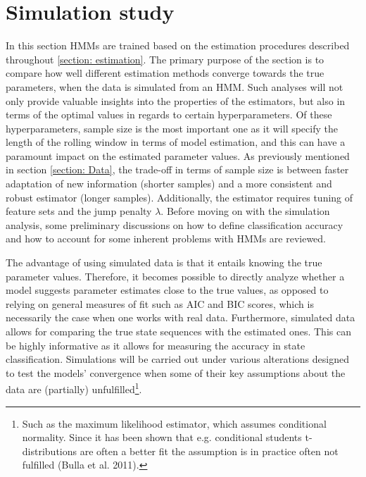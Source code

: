 \newpage

\section{Simulation study}
\label{Section: Simulation study}

In this section HMMs are trained based on the estimation procedures described throughout \cref{section: estimation}. The primary purpose of the section is to compare how well different estimation methods converge towards the true parameters, when the data is simulated from an HMM. Such analyses will not only provide valuable insights into the properties of the estimators, but also in terms of the optimal values in regards to certain hyperparameters. Of these hyperparameters, sample size is the most important one as it will specify the length of the rolling window in terms of model estimation, and this can have a paramount impact on the estimated parameter values. As previously mentioned in section \ref{section: Data}, the trade-off in terms of sample size is between faster adaptation of new information (shorter samples) and a more consistent and robust estimator (longer samples). Additionally, the \jump estimator requires tuning of feature sets and the jump penalty $\lambda$. Before moving on with the simulation analysis, some preliminary discussions on how to define classification accuracy and how to account for some inherent problems with HMMs are reviewed.

The advantage of using simulated data is that it entails knowing the true parameter values. Therefore, it becomes possible to directly analyze whether a model suggests parameter estimates close to the true values, as opposed to relying on general measures of fit such as AIC and BIC scores, which is necessarily the case when one works with real data. Furthermore, simulated data allows for comparing the true state sequences with the estimated ones. This can be highly informative as it allows for measuring the accuracy in state classification. Simulations will be carried out under various alterations designed to test the models' convergence when some of their key assumptions about the data are (partially) unfulfilled\footnote
{Such as the maximum likelihood estimator, which assumes conditional normality. Since it has been shown that e.g. conditional students t-distributions are often a better fit the assumption is in practice often not fulfilled (Bulla et al. 2011).
}.

